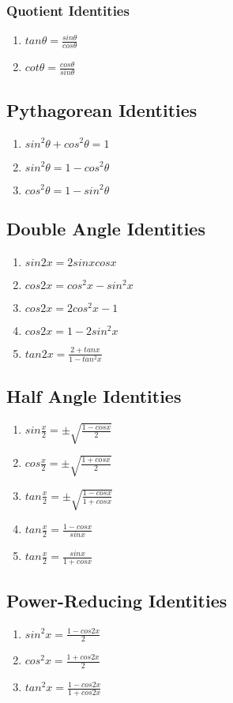 \documentclass[12pt, english]{article}
\begin{document}
	\subsubsection*{Quotient Identities}
	\begin{enumerate}
		\item $tan\theta = \frac{sin\theta}{cos\theta}$
		\item $cot\theta = \frac{cos\theta}{sin\theta}$
	\end{enumerate}
	\subsection{Pythagorean Identities}
	\begin{enumerate}
		\item $sin^2\theta + cos^2\theta = 1$
		\item $sin^2\theta = 1 - cos^2\theta$
		\item $cos^2\theta = 1 - sin^2\theta$
	\end{enumerate}
	\subsection{Double Angle Identities}
	\begin{enumerate}
		\item $sin2x = 2sinxcosx$
		\item $cos2x = cos^2x - sin^2x$
		\item $cos2x = 2cos^2x - 1$
		\item $cos2x = 1 - 2sin^2x$
		\item $tan2x = \frac{2 + tanx}{1 - tan^2x}$
	\end{enumerate}
	\subsection{Half Angle Identities}
	\begin{enumerate}
		\item $sin\frac{x}{2} = \pm\sqrt{\frac{1-cosx}{2}}$
		\item $cos\frac{x}{2} = \pm\sqrt{\frac{1+cosx}{2}}$
		\item $tan\frac{x}{2} = \pm\sqrt{\frac{1-cosx}{1+cosx}}$
		\item $tan\frac{x}{2} = \frac{1-cosx}{sinx}$
		\item $tan\frac{x}{2} = \frac{sinx}{1+cosx}$
	\end{enumerate}
	\subsection{Power-Reducing Identities}
	\begin{enumerate}
		\item $sin^2x = \frac{1-cos2x}{2}$
		\item $cos^2x = \frac{1+cos2x}{2}$
		\item $tan^2x = \frac{1-cos2x}{1+cos2x}$
	\end{enumerate}
\end{document}
